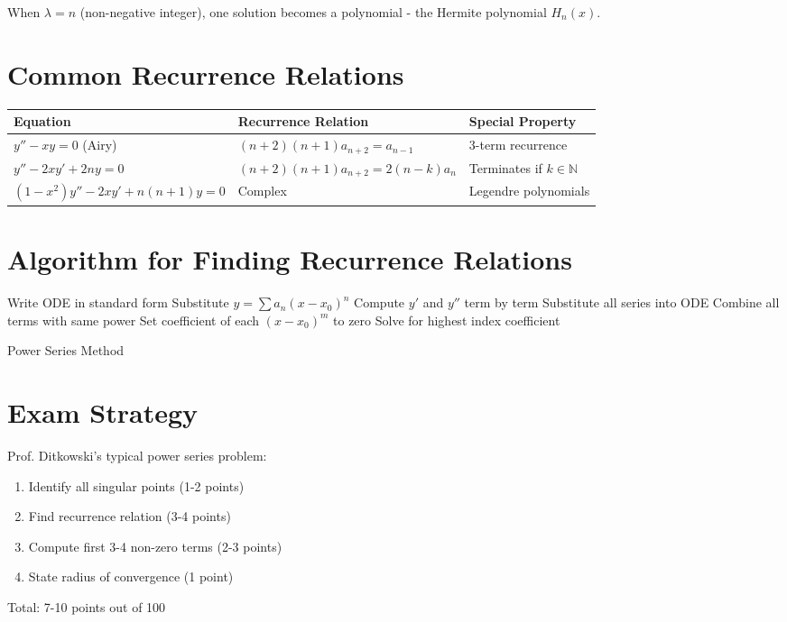 \documentclass[12pt]{article}
\begin{document}
\begin{examtip}
When $\lambda = n$ (non-negative integer), one solution becomes a polynomial - the Hermite polynomial $H_{n}(x)$.
\end{examtip}

\section{Common Recurrence Relations}

\begin{center}
\begin{tabular}{|l|l|l|}
\hline
\textbf{Equation} & \textbf{Recurrence Relation} & \textbf{Special Property} \\
\hline
$y'' - xy = 0$ (Airy) & $(n+2)(n+1)a_{n+2} = a_{n-1}$ & 3-term recurrence \\
\hline
$y'' - 2xy' + 2ny = 0$ & $(n+2)(n+1)a_{n+2} = 2(n-k)a_{n}$ & Terminates if $k \in \mathbb{N}$ \\
\hline
$(1-x^{2})y'' - 2xy' + n(n+1)y = 0$ & Complex & Legendre polynomials \\
\hline
\end{tabular}
\end{center}

\section{Algorithm for Finding Recurrence Relations}

\begin{algorithm}[H]
\SetAlgoLined
{}
Write ODE in standard form\;
Substitute $y = \sum a_{n}(x-x_{0})^{n}$\;
Compute $y'$ and $y''$ term by term\;
Substitute all series into ODE\;
Combine all terms with same power\;
Set coefficient of each $(x-x_{0})^{m}$ to zero\;
Solve for highest index coefficient\;
\caption{Power Series Method}
\end{algorithm}

\section{Exam Strategy}

\begin{examtip}
Prof. Ditkowski's typical power series problem:
\begin{enumerate}
\item Identify all singular points (1-2 points)
\item Find recurrence relation (3-4 points)
\item Compute first 3-4 non-zero terms (2-3 points)
\item State radius of convergence (1 point)
\end{enumerate}
Total: 7-10 points out of 100
\end{examtip}
\end{document}
